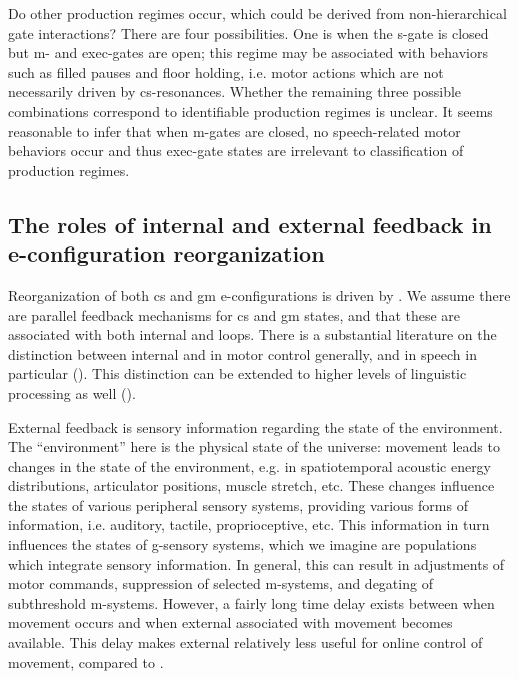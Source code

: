   Do other production regimes occur, which could  be derived from non-hi\-er\-ar\-chi\-cal gate interactions? There are four possibilities. One is when the s-gate is closed but m- and exec-gates are open; this regime may be associated with behaviors such as filled pauses and floor holding, i.e. motor actions which are not necessarily driven by cs-resonances. Whether the remaining three possible combinations correspond to identifiable production regimes is unclear. It seems reasonable to infer that when m-gates are closed, no speech-related motor behaviors occur and thus exec-gate states are irrelevant to classification of production regimes.

\subsection{The roles of internal and external feedback in e-configuration reorganization}

Reorganization of both cs and gm e-configurations is driven by . We assume there are parallel feedback mechanisms for cs and gm states, and that these are associated with both internal and  loops. There is a substantial literature on the distinction between internal and  in motor control generally, and in speech in particular (\citealt{Hickok2012,Kawato1999,MiallWolpert1996,RamanarayananEtAl2016,WolpertEtAl1995,WolpertKawato1998}). This distinction can be extended to higher levels of linguistic processing as well (\citealt{HagoortLevelt2009,Laver1973,Levelt1983,Levelt1989,Nooteboom1973,NooteboomQuené2008,Postma2000}).

  External feedback is sensory information regarding the state of the environment. The “environment” here is the physical state of the universe: movement leads to changes in the state of the environment, e.g. in spatiotemporal acoustic energy distributions, articulator positions, muscle stretch, etc. These changes influence the states of various peripheral sensory systems, providing various forms of information, i.e. auditory, tactile, proprioceptive, etc. This information in turn influences the states of g-sensory systems, which we imagine are populations which integrate sensory information. In general, this  can result in adjustments of motor commands, suppression of selected m-sys\-tems, and degating of subthreshold m-sys\-tems. However, a fairly long time delay exists between when movement occurs and when external  associated with movement becomes available. This delay makes external  relatively less useful for online control of movement, compared to . 

